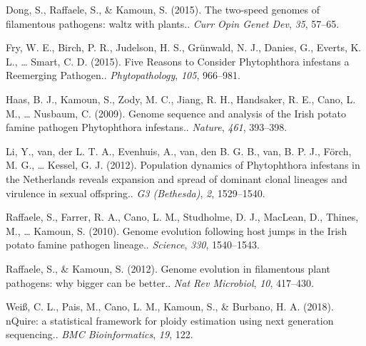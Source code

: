 \documentclass[10pt]{article}
\begin{document}
\label{csl:8}Dong, S., Raffaele, S., \& Kamoun, S. (2015). {The two-speed genomes of filamentous pathogens: waltz with plants.}. \textit{Curr Opin Genet Dev}, \textit{35}, 57–65.

\label{csl:2}Fry, W. E., Birch, P. R., Judelson, H. S., Grünwald, N. J., Danies, G., Everts, K. L., … Smart, C. D. (2015). {Five Reasons to Consider Phytophthora infestans a Reemerging Pathogen.}. \textit{Phytopathology}, \textit{105}, 966–981.

\label{csl:5}Haas, B. J., Kamoun, S., Zody, M. C., Jiang, R. H., Handsaker, R. E., Cano, L. M., … Nusbaum, C. (2009). {Genome sequence and analysis of the Irish potato famine pathogen Phytophthora infestans.}. \textit{Nature}, \textit{461}, 393–398.

\label{csl:1}Li, Y., van, der L. T. A., Evenhuis, A., van, den B. G. B., van, B. P. J., Förch, M. G., … Kessel, G. J. (2012). {Population dynamics of Phytophthora infestans in the Netherlands reveals expansion and spread of dominant clonal lineages and virulence in sexual offspring.}. \textit{G3 (Bethesda)}, \textit{2}, 1529–1540.

\label{csl:6}Raffaele, S., Farrer, R. A., Cano, L. M., Studholme, D. J., MacLean, D., Thines, M., … Kamoun, S. (2010). {Genome evolution following host jumps in the Irish potato famine pathogen lineage.}. \textit{Science}, \textit{330}, 1540–1543.

\label{csl:7}Raffaele, S., \& Kamoun, S. (2012). {Genome evolution in filamentous plant pathogens: why bigger can be better.}. \textit{Nat Rev Microbiol}, \textit{10}, 417–430.

\label{csl:4}Weiß, C. L., Pais, M., Cano, L. M., Kamoun, S., \& Burbano, H. A. (2018). {nQuire: a statistical framework for ploidy estimation using next generation sequencing.}. \textit{BMC Bioinformatics}, \textit{19}, 122.
\end{document}
